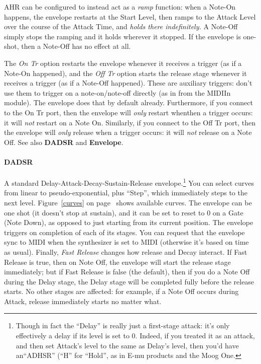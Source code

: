\documentclass{article}
\begin{document}
AHR can be configured to instead act as a {\it ramp} function: when a Note-On happens, the envelope restarts at the Start Level, then ramps to the Attack Level over the course of the Attack Time, and  {\it holds there indefinitely.}  A Note-Off simply stops the ramping and it holds wherever it stopped.  If the envelope is one-shot, then a Note-Off has no effect at all. 

The {\it On Tr} option restarts the envelope whenever it receives a trigger (as if a Note-On happened), and the {\it Off Tr} option starts the release stage whenever it receives a trigger (as if a Note-Off happened).  These are auxiliary triggers: don't use them to trigger on a note-on/note-off directly (as in from the MIDIIn module).  The envelope does that by default already.  Furthermore, if you connect to the On Tr port, then the envelope will {\it only} restart whenthen a trigger occurs: it will {\it not} restart on a Note On.  Similarly, if you connect to the Off Tr port, then the envelope will {\it only} release when a trigger occurs: it will {\it not} release on a Note Off.  See also {\bf DADSR} and {\bf Envelope}.

\paragraph{DADSR}  A standard Delay-Attack-Decay-Sustain-Release envelope.\footnote{Though in fact the ``Delay'' is really just a first-stage attack: it's only effectively a delay if its level is set to 0.  Indeed, if you treated it as an attack, and then set Attack's level to the same as Delay's level, then you'd have an``ADHSR'' (``H'' for ``Hold'', as in E-mu products and the Moog One.} You can select curves from linear to pseudo-exponential, plus ``Step'', which immediately steps to the next level.  Figure~\ref{curves} on page~\pageref{curves} shows available curves.  The envelope can be one shot (it doesn't stop at sustain), and it can be set to reset to 0 on a Gate (Note Down), as opposed to just starting from its current position.  The envelope triggers on completion of each of its stages.  You can request that the envelope sync to MIDI when the synthesizer is set to MIDI (otherwise it's based on time as usual).  Finally, {\it Fast Release} changes how release and Decay interact.  If Fast Release is true, then on Note Off, the envelope will start the release stage immediately; but if Fast Release is false (the default), then if you do a Note Off during the Delay stage, the Delay stage will be completed fully before the release starts.  No other stages are affected: for example, if a Note Off occurs during Attack, release immediately starts no matter what.
\end{document}
